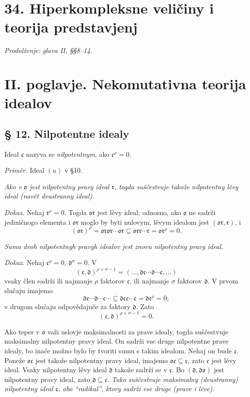 \documentclass[11pt]{article}
\providecommand{\mc}{\mathfrak{c}}
\providecommand{\md}{\mathfrak{d}}
\providecommand{\mo}{\mathfrak{o}}
\providecommand{\mr}{\mathfrak{r}}
\begin{document}
\section*{34. Hiperkompleksne veličiny i teorija predstavjenj}
\emph{Prodolženje: glava II, §§8--14.}

\section*{II. poglavje. Nekomutativna teorija idealov}

\subsection*{§ 12. Nilpotentne idealy}

Ideal $\mc$ nazyva se \emph{nilpotentnym}, ako $\mc^\rho=0$.

\emph{Priměr.} Ideal $(u)$ v §10.

\emph{Ako v $\mo$ jest nilpotentny pravy ideal $\mr$, togda suščestvuje takože nilpotentny lěvy ideal (navět dvustranny ideal).}

\emph{Dokaz.} Nehaj $\mr^\rho=0$. Togda $\mo\mr$ jest lěvy ideal; odnosno, ako $\mo$ ne sadrži jediničnogo elementa i $\mo\mr$ moglo by byti nulovym, lěvym idealom jest $(\mo\mr,\mr)$, i
\[
        (\mo\mr)^\rho=\mo\mr\mo\mr\cdots\mo\mr
        \subseteq\mo\mr\mr\cdots\mr=\mo\mr^\rho=0.
\]

\emph{Suma dvoh nilpotentnyh pravyh idealov jest znovu nilpotentny pravy ideal.}

\emph{Dokaz.} Nehaj $\mc^\rho=0$, $\md^\sigma=0$. V
\[
        (\mc,\md)^{\rho+\sigma-1}=(\ldots,\md\mc\cdots\md\cdots\mc,\ldots)
\]
vsaky člen sadrži ili najmanje $\rho$ faktorov $\mc$, ili najmanje $\sigma$ faktorov $\md$. V prvom slučaju imajemo
\[
        \md\mc\cdots\md\cdots\mc\cdots\subseteq\md\mc\mc\cdots\mc=\md\mc^\rho=0;
\]
v drugom slučaju odpovědajuče za faktory $\md$. Zato
\[
        (\mc,\md)^{\rho+\sigma-1}=0.
\]

Ako teper v $\mo$ važi uslovje maksimalnosti za prave idealy, togda suščestvuje maksimalny nilpotentny pravy ideal. On sadrži vse druge nilpotentne prave idealy, bo inače možno bylo by tvoriti sumu s takim idealom. Nehaj on bude $\mc$. Poneže $\mo\mc$ jest takože nilpotentny pravy ideal, imajemo $\mo\mc\subseteq\mc$, zato $\mc$ jest lěvy ideal. Vsaky nilpotentny lěvy ideal $\md$ takože sadrži se v $\mc$. Bo $(\md,\md\mo)$ jest nilpotentny pravy ideal, zato $\md\subseteq\mc$. \emph{Tako suščestvuje maksimalny (dvustranny) nilpotentny ideal $\mc$, abo “radikal”, ktory sadrži vse druge (prave i lěve).}
\end{document}

